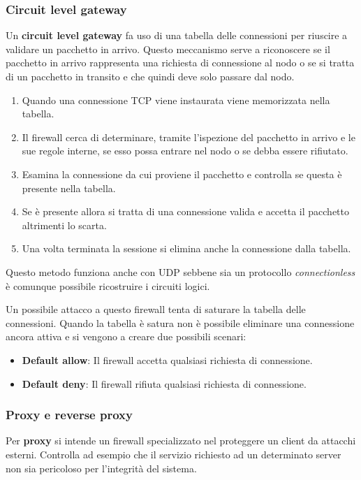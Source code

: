 \subsubsection{Circuit level gateway}
Un \textbf{circuit level gateway} fa uso di una tabella delle connessioni per riuscire a validare un pacchetto in
arrivo. Questo meccanismo serve a riconoscere se il pacchetto in arrivo rappresenta una richiesta di connessione al
nodo o se si tratta di un pacchetto in transito e che quindi deve solo passare dal nodo.
\begin{enumerate}
	\item Quando una connessione TCP viene instaurata viene memorizzata nella tabella.
	\item Il firewall cerca di determinare, tramite	l'ispezione del pacchetto in arrivo e le sue regole interne, se
	      esso possa entrare nel nodo o se debba essere rifiutato.
	\item Esamina la connessione da cui proviene il pacchetto e controlla se questa è presente nella tabella.
	\item Se è presente allora si tratta di una connessione valida e accetta il pacchetto altrimenti lo scarta.
	\item Una volta terminata la sessione si elimina anche la connessione dalla tabella.
\end{enumerate}
Questo metodo funziona anche con UDP sebbene sia un protocollo \emph{connectionless} è comunque possibile ricostruire
i circuiti logici.

Un possibile attacco a questo firewall tenta di saturare la tabella delle connessioni. Quando la tabella è satura non è
possibile eliminare una connessione ancora attiva e si vengono a creare due possibili scenari:
\begin{itemize}
	\item \textbf{Default allow}: Il firewall accetta qualsiasi richiesta di connessione.
	\item \textbf{Default deny}: Il firewall rifiuta qualsiasi richiesta di connessione.
\end{itemize}

\subsubsection{Proxy e reverse proxy}
Per \textbf{proxy} si intende un firewall specializzato nel proteggere un client da attacchi esterni. Controlla ad
esempio che il servizio richiesto ad un determinato server non sia pericoloso per l'integrità del sistema.

